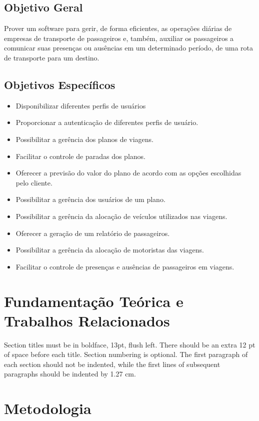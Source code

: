 \documentclass[12pt]{article}
\begin{document}
\subsection{Objetivo Geral}
 Prover um software para gerir, de forma eficientes, as operações diárias de empresas de transporte de passageiros e, também, auxiliar os passageiros a comunicar suas presenças ou ausências em um determinado período, de uma rota de transporte para um destino.
\subsection{Objetivos Específicos} \begin{itemize}
	\item Disponibilizar diferentes perfis de usuários
	\item Proporcionar a autenticação de diferentes perfis de usuário.
	\item Possibilitar a gerência dos planos de viagens.
	\item Facilitar o controle de paradas dos planos.
	\item Oferecer a previsão do valor do plano de acordo com as opções escolhidas pelo cliente.
	\item Possibilitar a gerência dos usuários de um plano.
	\item Possibilitar a gerência da alocação de veículos utilizados nas viagens.
	\item Oferecer a geração de um relatório de passageiros.
	\item Possibilitar a gerência da alocação de motoristas das viagens.
	\item Facilitar o controle de presenças e ausências de passageiros em viagens.
\end{itemize}

\section{Fundamentação Teórica e Trabalhos Relacionados}

Section titles must be in boldface, 13pt, flush left. There should be an extra
12 pt of space before each title. Section numbering is optional. The first
paragraph of each section should not be indented, while the first lines of
subsequent paragraphs should be indented by 1.27 cm.

\section{Metodologia}
\end{document}
